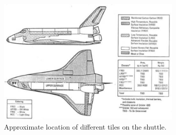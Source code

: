 \begin{figure}[h]
	\centering
	\includegraphics[width=0.8\textwidth]{img/space_shuttle.png}
	\caption[Use of composites in the Space Shuttle]{Approximate location of different tiles on the shuttle.\cite{Oakes}}
	\label{fig:space_shuttle}
\end{figure}
